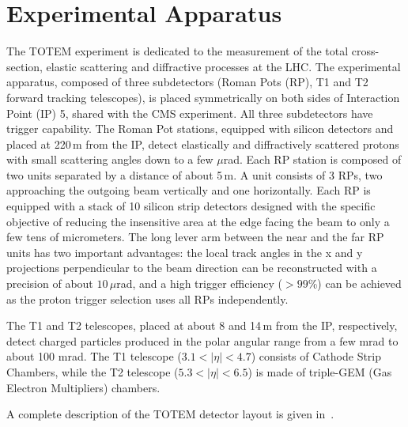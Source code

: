 \section{Experimental Apparatus}
%
The TOTEM experiment is dedicated to the measurement of the total 
cross-section, elastic scattering
and diffractive processes at the LHC. The experimental
apparatus, composed of three subdetectors
(Roman Pots (RP), T1 and T2 forward tracking telescopes), 
is placed symmetrically on both sides of Interaction Point (IP) 5, shared
with the CMS experiment. All three subdetectors have
trigger capability. The Roman Pot stations, equipped with
silicon detectors and placed at 220\,m from the IP,
detect elastically and diffractively scattered protons with
small scattering angles down to a few $\mu$rad. 
Each RP station is composed of two units separated
by a distance of about 5\,m. A unit consists of 3 RPs, two
approaching the outgoing beam vertically and one horizontally.
Each RP is equipped with a stack of 10 silicon
strip detectors designed with the specific objective of
reducing the insensitive area at the edge facing the beam
to only a few tens of micrometers. The long lever arm
between the near and the far RP units has two important
advantages: the local track angles in the x and y projections
perpendicular to the beam direction can be reconstructed
with a precision of about $10\,\mu$rad, and a high trigger efficiency
($> 99$\%) can be achieved as the proton trigger selection
uses all RPs independently.

The T1 and T2 telescopes, placed at about 8 and 14\,m from the IP, 
respectively, detect charged particles produced in the polar
angular range from a few mrad to about 100 mrad. The T1 telescope
($3.1 < |\eta| < 4.7$) consists of Cathode Strip Chambers,
while the T2 telescope ($5.3 < |\eta| < 6.5$) is made of
triple-GEM (Gas Electron Multipliers) chambers.

A complete description of the TOTEM detector layout is given in~\cite{jinst}.
